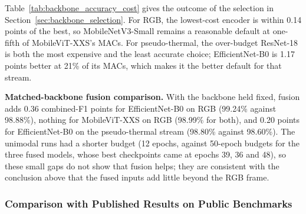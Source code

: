 \documentclass[journal]{IEEEtran}
\begin{document}
\begin{table}[!t]
\centering
\caption[Accuracy vs.\ cost of visual backbones]{Combined F1 (\%) vs.\ cost of the visual backbones (cost from Table~\ref{tab:backbone_candidates}). Fused: AdapFuse-v1 with that backbone. $^\dagger$Lower bound. -- = not trained.}
\label{tab:backbone_accuracy_cost}
\end{table}

Table~\ref{tab:backbone_accuracy_cost} gives the outcome of the selection in Section~\ref{sec:backbone_selection}. For RGB, the lowest-cost encoder is within 0.14 points of the best, so MobileNetV3-Small remains a reasonable default at one-fifth of MobileViT-XXS's MACs. For pseudo-thermal, the over-budget ResNet-18 is both the most expensive and the least accurate choice; EfficientNet-B0 is 1.17 points better at 21\% of its MACs, which makes it the better default for that stream.

\textbf{Matched-backbone fusion comparison.} With the backbone held fixed, fusion adds 0.36 combined-F1 points for EfficientNet-B0 on RGB (99.24\% against 98.88\%), nothing for MobileViT-XXS on RGB (98.99\% for both), and 0.20 points for EfficientNet-B0 on the pseudo-thermal stream (98.80\% against 98.60\%). The unimodal runs had a shorter budget (12 epochs, against 50-epoch budgets for the three fused models, whose best checkpoints came at epochs 39, 36 and 48), so these small gaps do not show that fusion helps; they are consistent with the conclusion above that the fused inputs add little beyond the RGB frame.

\subsubsection{Comparison with Published Results on Public Benchmarks}
\label{sec:public_benchmark_results}
\end{document}
